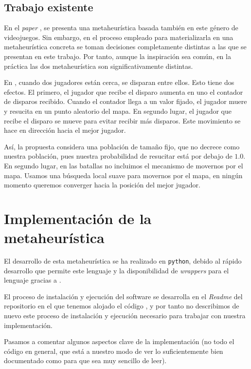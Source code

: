 \documentclass[11pt]{article}
\begin{document}
\subsection{Trabajo existente}

En el \emph{paper} \cite{other_paper:paper}, se presenta una metaheurística basada también en este género de videojuegos. Sin embargo, en el proceso empleado para materializarla en una metaheurística concreta se toman decisiones completamente distintas a las que se presentan en este  trabajo. Por tanto, aunque la inspiración sea común, en la práctica las dos metaheurística son significativamente distintas.

En \cite{other_paper:paper}, cuando dos jugadores están cerca, se disparan entre ellos. Esto tiene dos efectos. El primero, el jugador que recibe el disparo aumenta en uno el contador de disparos recibido. Cuando el contador llega a un valor fijado, el jugador muere y resucita en un punto aleatorio del mapa. En segundo lugar, el jugador que recibe el disparo se mueve para evitar recibir más disparos. Este movimiento se hace en dirección hacia el mejor jugador.

Así, la propuesta \cite{other_paper:paper} considera una población de tamaño fijo, que no decrece como nuestra población, pues nuestra probabilidad de resucitar está por debajo de $1.0$. En segundo lugar, en las batallas no incluimos el mecanismo de movernos por el mapa. Usamos una búsqueda local suave para movernos por el mapa, en ningún momento queremos converger hacia la posición del mejor jugador.

\pagebreak
\section{Implementación de la metaheurística} \label{implementacion}

El desarrollo de esta metaheurística se ha realizado en \lstinline{python}, debido al rápido desarrollo que permite este lenguaje y la disponibilidad de \emph{wrappers} para el lenguaje gracias a \cite{daniel_repo:online}.

El proceso de instalación y ejecución del software se desarrolla en el \emph{Readme} del repositorio en el que tenemos alojado el código \cite{repositorio:online}, y por tanto no describimos de nuevo este proceso de instalación y ejecución necesario para trabajar con nuestra implementación.

Pasamos a comentar algunos aspectos clave de la implementación (no todo el código en general, que está a nuestro modo de ver lo suficientemente bien documentado como para que sea muy sencillo de leer).
\end{document}
